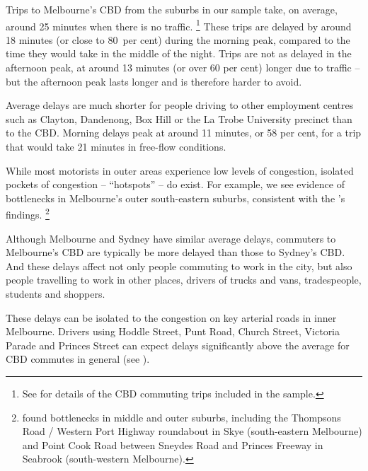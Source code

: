 \documentclass{grattan}
\begin{document}
Trips to Melbourne's CBD from the suburbs in our sample take, on average, around 25 minutes when there is no traffic.%
    \footnote{See  for details of the CBD commuting trips included in the sample.}
These trips are delayed by around 18 minutes (or close to 80~per cent) during the morning peak, compared to the time they would take in the middle of the night. Trips are not as delayed in the afternoon peak, at around 13 minutes (or over 60 per cent) longer due to traffic -- but the afternoon peak lasts longer and is therefore harder to avoid.

Average delays are much shorter for people driving to other employment centres such as Clayton, Dandenong, Box Hill or the La Trobe University precinct than to the CBD\@.
Morning delays peak at around 11 minutes, or 58 per cent, for a trip that would take 21 minutes in free-flow conditions. 

While most motorists in outer areas experience low levels of congestion, isolated pockets of congestion -- ``hotspots'' -- do exist. For example, we see evidence of bottlenecks in Melbourne's outer south-eastern suburbs, consistent with the \citeauthor{Redspotsurvey}'s  findings.%
    \footnote{\citeauthor{Redspotsurvey}  found bottlenecks in middle and outer suburbs, including the Thompsons Road / Western Port Highway roundabout in Skye (south-eastern Melbourne) and Point Cook Road between Sneydes Road and Princes Freeway in Seabrook (south-western Melbourne).}

Although Melbourne and Sydney have similar average delays, commuters to Melbourne’s CBD are typically be more delayed than those to Sydney’s CBD\@. And these delays affect not only people commuting to work in the city, but also people travelling to work in other places, drivers of trucks and vans, tradespeople, students and shoppers.

These delays can be isolated to the congestion on key arterial roads in inner Melbourne. Drivers using Hoddle Street, Punt Road, Church Street, Victoria Parade and Princes Street can expect delays significantly above the average for CBD commutes in general (see ).
\end{document}

